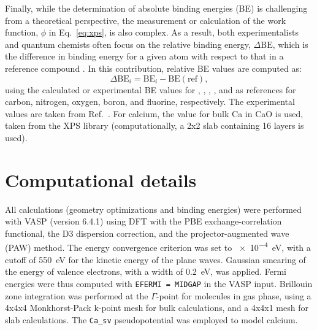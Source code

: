 \documentclass[%
aip,
amsmath,amssymb,
preprint,%
jcp,
showkeys,
]{revtex4-2}
\begin{document}
Finally, while the determination of absolute binding energies (BE) is challenging from a theoretical perspective, the measurement or calculation of the work function, $\phi$ in Eq.~\eqref{eq:xps}, is also complex. As a result, both experimentalists and quantum chemists often focus on the relative binding energy, $\Delta\text{BE}$, which is the difference in binding energy for a given atom with respect  to that in a reference compound \cite{vinesPredictionCoreLevel2018,stevieIntroductionXrayPhotoelectron2020,greczynskiXrayPhotoelectronSpectroscopy2020}. In this contribution, relative BE values are computed as:\begin{equation}
	\Delta\text{BE}_i = \text{BE}_i - \text{BE}(\text{ref}), \label{eq:dbe}
\end{equation} 
using the calculated or experimental BE values for , , , , and  as references for carbon, nitrogen, oxygen, boron, and fluorine, respectively. The experimental values are taken from Ref.~. For calcium, the value for bulk Ca in CaO is used, taken from the XPS library \cite{cristXPSLibraryWebsite2021a} (computationally, a  2x2 slab containing 16 layers is used).

	
\section{Computational details}\label{sec:comp}

All calculations (geometry optimizations and binding energies) were performed  with VASP (version 6.4.1) using DFT with the PBE exchange-correlation functional, the D3 dispersion correction, and the projector-augmented wave (PAW) method.\cite{blochlProjectorAugmentedwaveMethod1994} The energy convergence criterion was set to \SI{e-4}{\electronvolt}, with a cutoff of \SI{550}{\electronvolt} for the kinetic energy of the plane waves. Gaussian smearing of the energy of valence electrons, with a width of \SI{0.2}{\electronvolt}, was applied.  Fermi energies were thus computed with \texttt{EFERMI = MIDGAP} in the VASP input. Brillouin zone integration was performed at the $\Gamma$-point for molecules in gas phase, using a 4x4x4 Monkhorst-Pack k-point mesh\cite{monkhorstSpecialPointsBrillouinzone1976} for bulk calculations, and a 4x4x1 mesh for slab calculations. The \texttt{Ca\_sv} pseudopotential\cite{blochlProjectorAugmentedwaveMethod1994,kresseUltrasoftPseudopotentialsProjector1999} was employed to model calcium.
\end{document}
